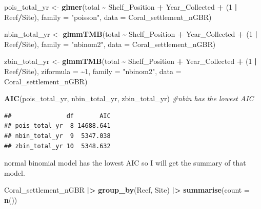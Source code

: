\documentclass[
]{article}
\newenvironment{Shaded}{\begin{snugshade}}{\end{snugshade}}
\newcommand{\AttributeTok}[1]{\textcolor[rgb]{0.13,0.29,0.53}{#1}}
\newcommand{\CommentTok}[1]{\textcolor[rgb]{0.56,0.35,0.01}{\textit{#1}}}
\newcommand{\DecValTok}[1]{\textcolor[rgb]{0.00,0.00,0.81}{#1}}
\newcommand{\FunctionTok}[1]{\textcolor[rgb]{0.13,0.29,0.53}{\textbf{#1}}}
\newcommand{\NormalTok}[1]{#1}
\newcommand{\OtherTok}[1]{\textcolor[rgb]{0.56,0.35,0.01}{#1}}
\newcommand{\SpecialCharTok}[1]{\textcolor[rgb]{0.81,0.36,0.00}{\textbf{#1}}}
\newcommand{\StringTok}[1]{\textcolor[rgb]{0.31,0.60,0.02}{#1}}
\begin{document}
\begin{Shaded}
\begin{Highlighting}[]
\NormalTok{pois\_total\_yr }\OtherTok{\textless{}{-}} \FunctionTok{glmer}\NormalTok{(total }\SpecialCharTok{\textasciitilde{}}\NormalTok{ Shelf\_Position }\SpecialCharTok{+}\NormalTok{ Year\_Collected }\SpecialCharTok{+}\NormalTok{ (}\DecValTok{1} \SpecialCharTok{|}\NormalTok{ Reef}\SpecialCharTok{/}\NormalTok{Site), }
      \AttributeTok{family =} \StringTok{"poisson"}\NormalTok{, }\AttributeTok{data =}\NormalTok{ Coral\_settlement\_nGBR)}

\NormalTok{nbin\_total\_yr }\OtherTok{\textless{}{-}} \FunctionTok{glmmTMB}\NormalTok{(total }\SpecialCharTok{\textasciitilde{}}\NormalTok{ Shelf\_Position }\SpecialCharTok{+}\NormalTok{ Year\_Collected }\SpecialCharTok{+}\NormalTok{ (}\DecValTok{1} \SpecialCharTok{|}\NormalTok{ Reef}\SpecialCharTok{/}\NormalTok{Site), }
        \AttributeTok{family =} \StringTok{"nbinom2"}\NormalTok{, }\AttributeTok{data =}\NormalTok{ Coral\_settlement\_nGBR)}

\NormalTok{zbin\_total\_yr }\OtherTok{\textless{}{-}} \FunctionTok{glmmTMB}\NormalTok{(total }\SpecialCharTok{\textasciitilde{}}\NormalTok{ Shelf\_Position }\SpecialCharTok{+}\NormalTok{ Year\_Collected }\SpecialCharTok{+}\NormalTok{ (}\DecValTok{1} \SpecialCharTok{|}\NormalTok{ Reef}\SpecialCharTok{/}\NormalTok{Site),}
                      \AttributeTok{ziformula =} \SpecialCharTok{\textasciitilde{}}\DecValTok{1}\NormalTok{,}
        \AttributeTok{family =} \StringTok{"nbinom2"}\NormalTok{, }\AttributeTok{data =}\NormalTok{ Coral\_settlement\_nGBR)}

\FunctionTok{AIC}\NormalTok{(pois\_total\_yr, nbin\_total\_yr, zbin\_total\_yr) }\CommentTok{\#nbin has the lowest AIC}
\end{Highlighting}
\end{Shaded}

\begin{verbatim}
##               df       AIC
## pois_total_yr  8 14688.641
## nbin_total_yr  9  5347.038
## zbin_total_yr 10  5348.632
\end{verbatim}

normal binomial model has the lowest AIC so I will get the summary of
that model.

\begin{Shaded}
\begin{Highlighting}[]
\NormalTok{Coral\_settlement\_nGBR }\SpecialCharTok{|\textgreater{}} 
\FunctionTok{group\_by}\NormalTok{(Reef, Site) }\SpecialCharTok{|\textgreater{}} 
  \FunctionTok{summarise}\NormalTok{(}\AttributeTok{count =} \FunctionTok{n}\NormalTok{())}
\end{Highlighting}
\end{Shaded}
\end{document}
